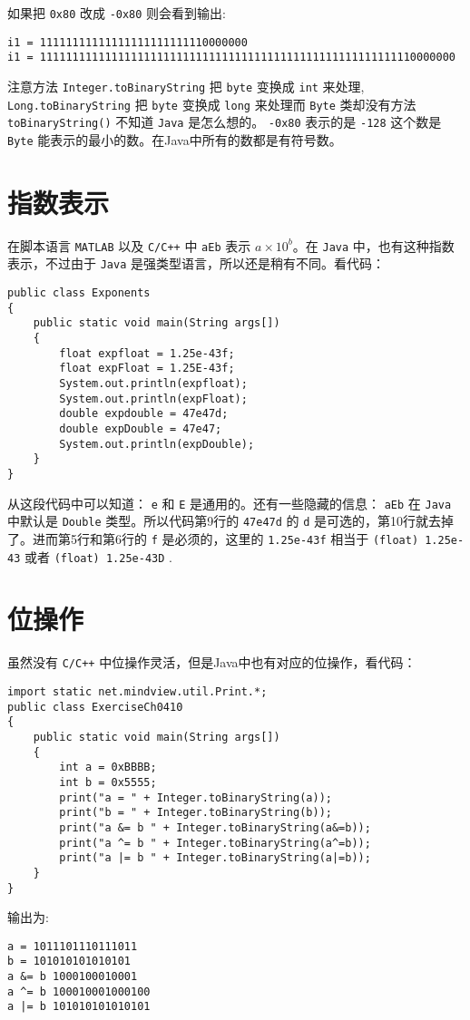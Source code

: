 \documentclass[10pt,a4paper,UTF8]{article}
\begin{document}
如果把 \texttt{0x80} 改成 \texttt{-0x80} 则会看到输出:
\begin{verbatim}
i1 = 11111111111111111111111110000000
i1 = 1111111111111111111111111111111111111111111111111111111110000000
\end{verbatim}

注意方法 \texttt{Integer.toBinaryString} 把 \texttt{byte} 变换成 \texttt{int} 来处理, \texttt{Long.toBinaryString} 把 \texttt{byte} 变换成 \texttt{long} 来处理而 \texttt{Byte} 类却没有方法 \texttt{toBinaryString()} 不知道 \texttt{Java} 是怎么想的。 \texttt{-0x80} 表示的是 \texttt{-128} 这个数是 \texttt{Byte} 能表示的最小的数。在Java中所有的数都是有符号数。
\section{指数表示}
\label{sec:orgheadline6}


在脚本语言 \texttt{MATLAB} 以及 \texttt{C/C++} 中 \texttt{aEb} 表示 \(a\times 10^{b}\)。在 \texttt{Java} 中，也有这种指数表示，不过由于 \texttt{Java} 是强类型语言，所以还是稍有不同。看代码：
\lstset{language=java,label= ,caption= ,captionpos=b,firstnumber=1,numbers=left}
\begin{lstlisting}
public class Exponents
{
    public static void main(String args[])
    {
        float expfloat = 1.25e-43f;
        float expFloat = 1.25E-43f;
        System.out.println(expfloat);
        System.out.println(expFloat);
        double expdouble = 47e47d;
        double expDouble = 47e47;
        System.out.println(expDouble);
    }
}
\end{lstlisting}
从这段代码中可以知道： \texttt{e} 和 \texttt{E} 是通用的。还有一些隐藏的信息： \texttt{aEb} 在 \texttt{Java} 中默认是 \texttt{Double} 类型。所以代码第9行的 \texttt{47e47d} 的 \texttt{d} 是可选的，第10行就去掉了。进而第5行和第6行的 \texttt{f} 是必须的，这里的 \texttt{1.25e-43f} 相当于 \texttt{(float) 1.25e-43} 或者 \texttt{(float) 1.25e-43D} .
\section{位操作}
\label{sec:orgheadline7}


虽然没有 \texttt{C/C++} 中位操作灵活，但是Java中也有对应的位操作，看代码：
\lstset{language=java,label= ,caption= ,captionpos=b,firstnumber=1,numbers=left}
\begin{lstlisting}
import static net.mindview.util.Print.*;
public class ExerciseCh0410
{
    public static void main(String args[])
    {
        int a = 0xBBBB;
        int b = 0x5555;
        print("a = " + Integer.toBinaryString(a));
        print("b = " + Integer.toBinaryString(b));
        print("a &= b " + Integer.toBinaryString(a&=b));
        print("a ^= b " + Integer.toBinaryString(a^=b));
        print("a |= b " + Integer.toBinaryString(a|=b));
    }
}
\end{lstlisting}
输出为:
\begin{verbatim}
a = 1011101110111011
b = 101010101010101
a &= b 1000100010001
a ^= b 100010001000100
a |= b 101010101010101
\end{verbatim}
\end{document}
